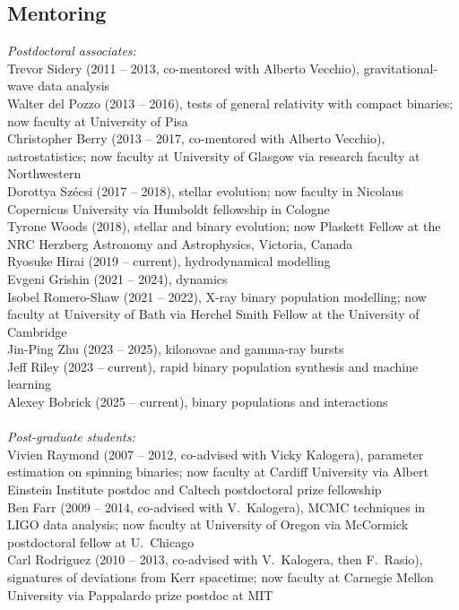 \documentclass[margin,line]{res}
\begin{document}
\begin{resume}
\section{\sc Mentoring}
{\it Postdoctoral associates:}\\
Trevor Sidery (2011 -- 2013, co-mentored with Alberto Vecchio), gravitational-wave data analysis\\
Walter del Pozzo (2013 -- 2016), tests of general relativity with compact binaries; now faculty at University of Pisa\\
Christopher Berry (2013 -- 2017, co-mentored with Alberto Vecchio), astrostatistics; now faculty at University of Glasgow via research faculty at Northwestern\\
Dorottya Sz\'{e}csi (2017 -- 2018), stellar evolution; now faculty in Nicolaus Copernicus University via Humboldt fellowship in Cologne\\
Tyrone Woods (2018), stellar and binary evolution; now Plaskett Fellow at the NRC Herzberg Astronomy and Astrophysics, Victoria, Canada\\
Ryosuke Hirai (2019 -- current), hydrodynamical modelling\\
Evgeni Grishin (2021 -- 2024), dynamics\\
Isobel Romero-Shaw (2021 -- 2022), X-ray binary population modelling; now faculty at University of Bath via Herchel Smith Fellow at the University of Cambridge\\
Jin-Ping Zhu (2023 -- 2025), kilonovae and gamma-ray bursts\\
Jeff Riley (2023 -- current), rapid binary population synthesis and machine learning\\
Alexey Bobrick (2025 -- current), binary populations and interactions\\
\\
{\it Post-graduate students:}\\
Vivien Raymond (2007 -- 2012, co-advised with Vicky Kalogera), parameter estimation on spinning binaries; now faculty at Cardiff University via Albert Einstein Institute postdoc and Caltech postdoctoral prize fellowship\\
Ben Farr (2009 -- 2014, co-advised with V.~Kalogera), MCMC techniques in LIGO data analysis; now faculty at University of Oregon via McCormick postdoctoral fellow at U.~Chicago\\
Carl Rodriguez (2010 -- 2013, co-advised with V.~Kalogera, then F.~Rasio), signatures of deviations from Kerr spacetime; now faculty at Carnegie Mellon University via Pappalardo prize postdoc at MIT\\

\end{resume}
\end{document}
